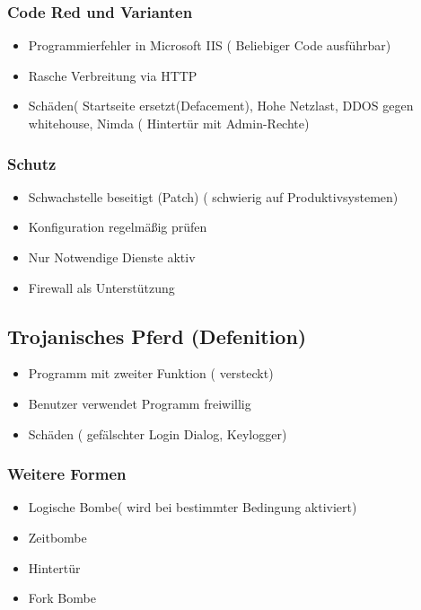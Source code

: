 {\subsubsection*{ Code Red und Varianten}
\begin{itemize}
	\item Programmierfehler in Microsoft IIS ( Beliebiger Code ausführbar)
	\item Rasche Verbreitung via HTTP
	\item Schäden( Startseite ersetzt(Defacement), Hohe Netzlast, DDOS gegen whitehouse, Nimda ( Hintertür mit Admin-Rechte)
\end{itemize}

\subsubsection*{ Schutz }
\begin{itemize}
	\item Schwachstelle beseitigt (Patch) ( schwierig auf Produktivsystemen)
	\item Konfiguration regelmäßig prüfen
	\item Nur Notwendige Dienste aktiv
	\item Firewall als Unterstützung
\end{itemize}


	\subsection*{Trojanisches Pferd (Defenition)}
\begin{itemize}
	\item Programm mit zweiter Funktion ( versteckt)
	\item Benutzer verwendet Programm freiwillig
	\item Schäden ( gefälschter Login Dialog, Keylogger)
\end{itemize}

\subsubsection*{ Weitere Formen }
\begin{itemize}
	\item Logische Bombe( wird bei bestimmter Bedingung aktiviert)
	\item Zeitbombe
	\item Hintertür 
	\item Fork Bombe
\end{itemize}

}

